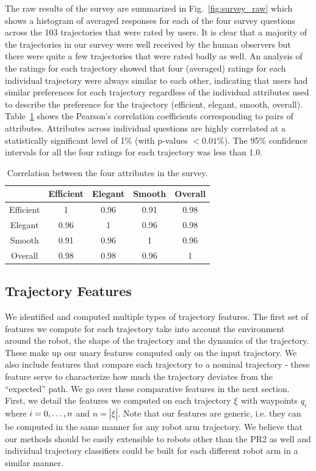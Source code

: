 \documentclass[letterpaper, 10 pt, conference]{ieeeconf}  %
\newcommand{\tj}[1]{\ensuremath{\xi_\text{#1}}}
\begin{document}
The raw results of the survey are summarized in Fig.~\ref{fig:survey_raw} which shows a histogram of averaged responses for each of the four survey questions across the 103 trajectories that were rated by users. It is clear that a majority of the trajectories in our survey were well received by the human observers but there were quite a few trajectories that were rated badly as well. An analysis of the ratings for each trajectory showed that four (averaged) ratings for each individual trajectory were always similar to each other, indicating that users had similar preferences for each trajectory regardless of the individual attributes used to describe the preference for the trajectory (efficient, elegant, smooth, overall). Table~\ref{tab:correlation} shows the Pearson's correlation coefficients corresponding to pairs of attributes. Attributes across individual questions are highly correlated at a statistically significant level of 1\% (with p-values $< 0.01\%$). The 95\% confidence intervals for all the four ratings for each trajectory was less than 1.0. 
\begin{table}
\centering
\begin{tabular}{|c|c|c|c|c|}
\hline
& Efficient & Elegant & Smooth & Overall \\ \hline
Efficient & 1 & 0.96 & 0.91 & 0.98 \\ \hline
Elegant & 0.96 & 1 & 0.96 & 0.98 \\ \hline
Smooth & 0.91 & 0.96 & 1 & 0.96 \\ \hline
Overall & 0.98 & 0.98 & 0.96 & 1 \\ \hline
\end{tabular}
\caption{Correlation between the four attributes in the survey.}
\label{tab:correlation}
\end{table}

\subsection{Trajectory Features}
\label{subsec:traj_feat}

We identified and computed multiple types of trajectory features. The first set of features we compute for each trajectory take into account the environment around the robot, the shape of the trajectory and the dynamics of the trajectory. These make up our unary features computed only on the input trajectory. We also include features that compare each trajectory to a nominal trajectory - these feature serve to characterize how much the trajectory deviates from the ``expected'' path. We go over these comparative features in the next section. First, we detail the features we computed on each trajectory \tj{} with waypoints $q_i$ where $i={0,\mathellipsis,n}$ and $n=|\tj{}|$. Note that our features are generic, i.e. they can be computed in the same manner for any robot arm trajectory. We believe that our methods should be easily extensible to robots other than the PR2 as well and individual trajectory classifiers could be built for each different robot arm in a similar manner.  
\end{document}
